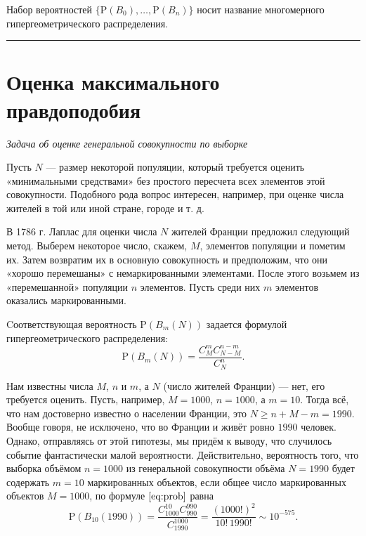 \documentclass[11pt,a4paper]{article}
\begin{document}
Набор вероятностей \(\{\mathrm{P}(B_0), \ldots,\mathrm{P}(B_n)\}\) носит
название многомерного гипергеометрического распределения.

    \begin{center}\rule{0.5\linewidth}{\linethickness}\end{center}

    \hypertarget{ux43eux446ux435ux43dux43aux430-ux43cux430ux43aux441ux438ux43cux430ux43bux44cux43dux43eux433ux43e-ux43fux440ux430ux432ux434ux43eux43fux43eux434ux43eux431ux438ux44f}{%
\section{Оценка максимального
правдоподобия}\label{ux43eux446ux435ux43dux43aux430-ux43cux430ux43aux441ux438ux43cux430ux43bux44cux43dux43eux433ux43e-ux43fux440ux430ux432ux434ux43eux43fux43eux434ux43eux431ux438ux44f}}

\emph{Задача об оценке генеральной совокупности по выборке}

    Пусть \(N\) --- размер некоторой популяции, который требуется оценить
«минимальными средствами» без простого пересчета всех элементов этой
совокупности. Подобного рода вопрос интересен, например, при оценке
числа жителей в той или иной стране, городе и т. д.

В 1786 г. Лаплас для оценки числа \(N\) жителей Франции предложил
следующий метод. Выберем некоторое число, скажем, \(M\), элементов
популяции и пометим их. Затем возвратим их в основную совокупность и
предположим, что они «хорошо перемешаны» с немаркированными элементами.
После этого возьмем из «перемешанной» популяции \(n\) элементов. Пусть
среди них \(m\) элементов оказались маркированными.

Cоответствующая вероятность \(\mathrm{P}(B_m(N))\) задается формулой
гипергеометрического распределения: \[
    \mathrm{P}(B_m(N)) = \frac{C_M^m C_{N-M}^{n-m}}{C_N^n}. \tag{1}\label{eq:prob}
\]

Нам известны числа \(M\), \(n\) и \(m\), а \(N\) (число жителей Франции)
--- нет, его требуется оценить. Пусть, например, \(M=1000\), \(n=1000\),
а \(m=10\). Тогда всё, что нам достоверно известно о населении Франции,
это \(N \ge n + M - m = 1990\). Вообще говоря, не исключено, что во
Франции и живёт ровно \(1990\) человек. Однако, отправляясь от этой
гипотезы, мы придём к выводу, что случилось событие фантастически малой
вероятности. Действительно, вероятность того, что выборка объёмом
\(n=1000\) из генеральной совокупности объёма \(N=1990\) будет содержать
\(m=10\) маркированных объектов, если общее число маркированных объектов
\(M=1000\), по формуле \(\eqref{eq:prob}\) равна \[
    \mathrm{P}(B_{10}(1990)) = \frac{C_{1000}^{10} C_{990}^{990}}{C_{1990}^{1000}} = \frac{(1000!)^2}{10! \, 1990!} \sim 10^{-575}.
\]
\end{document}

